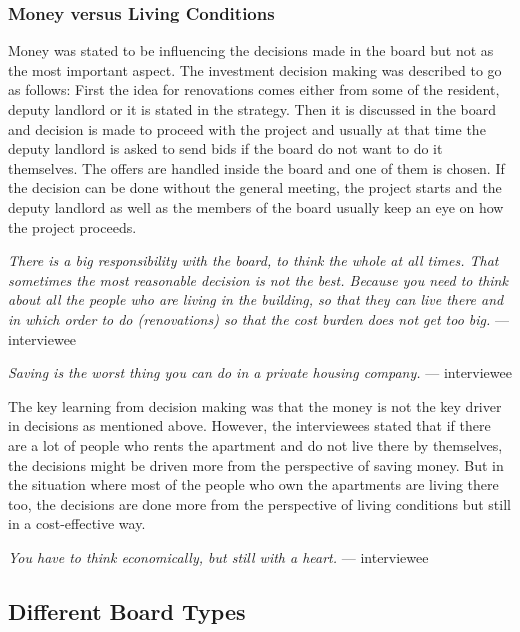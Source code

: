 \subsubsection*{Money versus Living Conditions}

Money was stated to be influencing the decisions made in the board but not as the most important aspect. The investment decision making was described to go as follows: First the idea for renovations comes either from some of the resident, deputy landlord or it is stated in the strategy. Then it is discussed in the board and decision is made to proceed with the project and usually at that time the deputy landlord is asked to send bids if the board do not want to do it themselves. The offers are handled inside the board and one of them is chosen. If the decision can be done without the general meeting, the project starts and the deputy landlord as well as the members of the board usually keep an eye on how the project proceeds.

\begin{displayquote}
\textit{There is a big responsibility with the board, to think the whole at all times. That sometimes the most reasonable decision is not the best. Because you need to think about all the people who are living in the building, so that they can live there and in which order to do (renovations) so that the cost burden does not get too big.} --- interviewee
\end{displayquote}

\begin{displayquote}
\textit{Saving is the worst thing you can do in a private housing company.} --- interviewee
\end{displayquote}

The key learning from decision making was that the money is not the key driver in decisions as mentioned above. However, the interviewees stated that if there are a lot of people who rents the apartment and do not live there by themselves, the decisions might be driven more from the perspective of saving money. But in the situation where most of the people who own the apartments are living there too, the decisions are done more from the perspective of living conditions but still in a cost-effective way.

\begin{displayquote}
\textit{You have to think economically, but still with a heart.} --- interviewee
\end{displayquote}

\subsection{Different Board Types}


